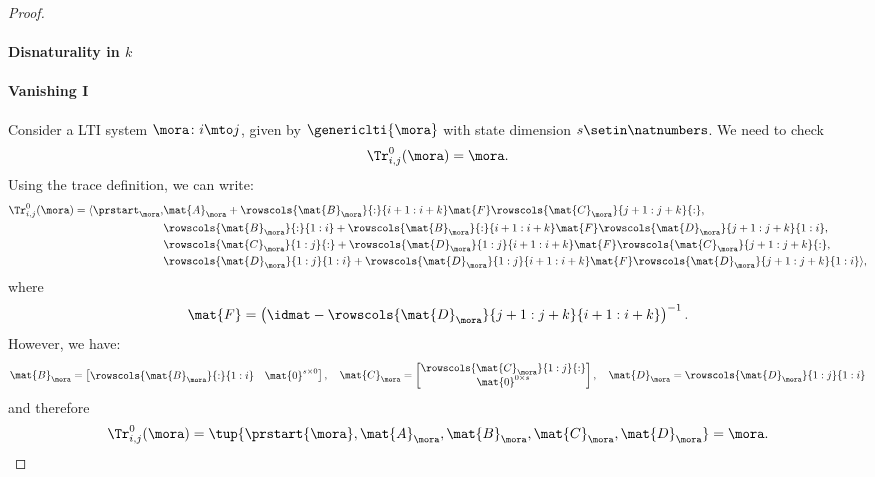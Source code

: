 {\begin{proof}
        \paragraph*{Disnaturality in $k$}

        \paragraph*{Vanishing I}
        Consider a LTI system $\mora\colon i\mto j$, given by $\genericlti{\mora}$ with state dimension $s\setin \natnumbers$.
        We need to check
        \begin{equation*}
            \Tr_{i,j}^0 (\mora)=\mora.
        \end{equation*}
        Using the trace definition, we can write:
        \begin{equation*}
            \begin{aligned}
                \Tr_{i,j}^0 (\mora)=\langle\prstart_{\mora}, & \mat{A}_\mora+\rowscols{\mat{B}_{\mora}}{:}{i+1:i+k}\mat{F}\rowscols{\mat{C}_{\mora}}{j+1:j+k}{:}, \\
                                                             & \rowscols{\mat{B}_{\mora}}{:}{1:i}+ \rowscols{\mat{B}_{\mora}}{:}{i+1:i+k}\mat{F}\rowscols{\mat{D}_{\mora}}{j+1:j+k}{1:i}, \\
                                                             & \rowscols{\mat{C}_{\mora}}{1:j}{:}+\rowscols{\mat{D}_{\mora}}{1:j}{i+1:i+k}\mat{F}\rowscols{\mat{C}_{\mora}}{j+1:j+k}{:}, \\
                                                             & \rowscols{\mat{D}_{\mora}}{1:j}{1:i}+ \rowscols{\mat{D}_{\mora}}{1:j}{i+1:i+k}\mat{F}\rowscols{\mat{D}_{\mora}}{j+1:j+k}{1:i}\rangle,
            \end{aligned}
        \end{equation*}
        where
        \begin{equation*}
            \mat{F}=\left(\idmat - \rowscols{\mat{D}_{\mora}}{j+1:j+k}{i+1:i+k}\right)^{-1}.
        \end{equation*}
        However, we have:
        \begin{equation*}
            \mat{B}_\mora=\begin{bmatrix}
                \rowscols{\mat{B}_{\mora}}{:}{1:i} & \mat{0}^{s\times 0}
            \end{bmatrix},\quad
            \mat{C}_\mora=\begin{bmatrix}
                \rowscols{\mat{C}_{\mora}}{1:j}{:} \\ \mat{0}^{0\times s}
            \end{bmatrix},
            \quad
            \mat{D}_\mora= \rowscols{\mat{D}_\mora}{1:j}{1:i}
        \end{equation*}
        and therefore
        \begin{equation*}
            \Tr_{i,j}^0 (\mora)=\tup{\prstart{\mora}, \mat{A}_\mora, \mat{B}_\mora, \mat{C}_\mora, \mat{D}_\mora}=\mora.
        \end{equation*}


\end{proof}}
